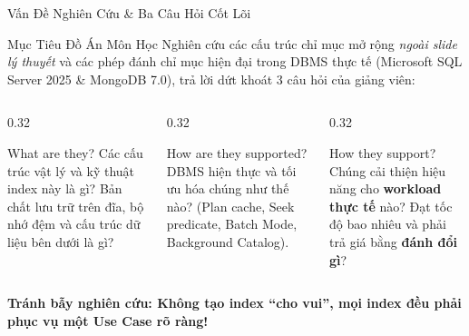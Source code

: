 \documentclass[aspectratio=169,9pt]{beamer}
\begin{document}
\begin{frame}{Vấn Đề Nghiên Cứu \& Ba Câu Hỏi Cốt Lõi}
\begin{block}{Mục Tiêu Đồ Án Môn Học}
Nghiên cứu các cấu trúc chỉ mục mở rộng \emph{ngoài slide lý thuyết} và các phép đánh chỉ mục hiện đại trong DBMS thực tế (Microsoft SQL Server 2025 \& MongoDB 7.0), trả lời dứt khoát 3 câu hỏi của giảng viên:
\end{block}

\begin{columns}[T]
\begin{column}{0.32\textwidth}
\begin{block}{ What are they?}
\footnotesize
Các cấu trúc vật lý và kỹ thuật index này là gì? Bản chất lưu trữ trên đĩa, bộ nhớ đệm và cấu trúc dữ liệu bên dưới là gì?
\end{block}
\end{column}

\begin{column}{0.32\textwidth}
\begin{block}{ How are they supported?}
\footnotesize
DBMS hiện thực và tối ưu hóa chúng như thế nào? (Plan cache, Seek predicate, Batch Mode, Background Catalog).
\end{block}
\end{column}

\begin{column}{0.32\textwidth}
\begin{alertblock}{ How they support?}
\footnotesize
Chúng cải thiện hiệu năng cho \textbf{workload thực tế} nào? Đạt tốc độ bao nhiêu và phải trả giá bằng \textbf{đánh đổi gì}?
\end{alertblock}
\end{column}
\end{columns}

\vspace{0.4cm}
\centering
\textbf{\color{red!80!black} Tránh bẫy nghiên cứu: Không tạo index ``cho vui'', mọi index đều phải phục vụ một Use Case rõ ràng!}
\end{frame}
\end{document}
